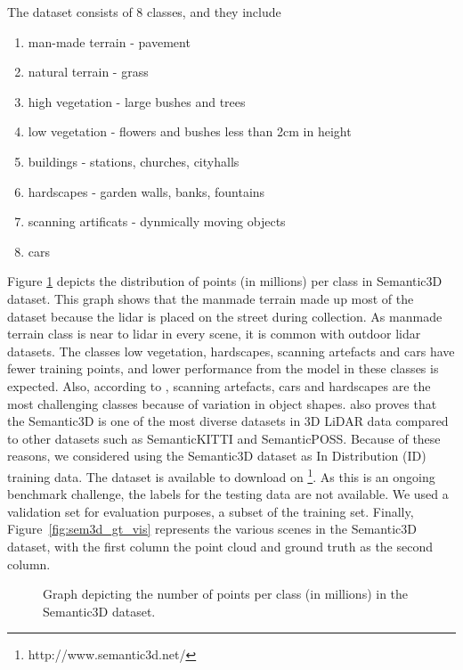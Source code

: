     The dataset consists of 8 classes, and they include
\begin{enumerate}
    \item man-made terrain - pavement
    \item natural terrain - grass
    \item high vegetation - large bushes and trees
    \item low vegetation - flowers and bushes less than 2cm in height
    \item buildings - stations, churches, cityhalls
    \item hardscapes - garden walls, banks, fountains
    \item scanning artificats - dynmically moving objects
    \item cars
\end{enumerate}
Figure \ref{fig:sem3ddist} depicts the distribution of points (in millions) per class in Semantic3D dataset.
This graph shows that the manmade terrain made up most of the dataset because the lidar is placed on the street during collection.
As manmade terrain class is near to lidar in every scene, it is common with outdoor lidar datasets.
The classes low vegetation, hardscapes, scanning artefacts and cars have fewer training points, and lower performance from the model in these classes is expected.
Also, according to \cite{hackel2017semantic3d}, scanning artefacts, cars and hardscapes are the most challenging classes because of variation in object shapes.
\cite{survey3d} also proves that the Semantic3D is one of the most diverse datasets in 3D LiDAR data compared to other datasets such as SemanticKITTI and SemanticPOSS.
Because of these reasons, we considered using the Semantic3D dataset as In Distribution (ID) training data.
The dataset is available to download on \footnote[1]{http://www.semantic3d.net/}. 
As this is an ongoing benchmark challenge, the labels for the testing data are not available.
We used a validation set for evaluation purposes, a subset of the training set.
Finally, Figure~\ref{fig:sem3d_gt_vis} represents the various scenes in the Semantic3D dataset, with the first column the point cloud and ground truth as the second column.
\begin{figure}[h!]
    \centering
    
    \caption{Graph depicting the number of points per class (in millions) in the Semantic3D dataset.}
    \label{fig:sem3ddist}
\end{figure}


